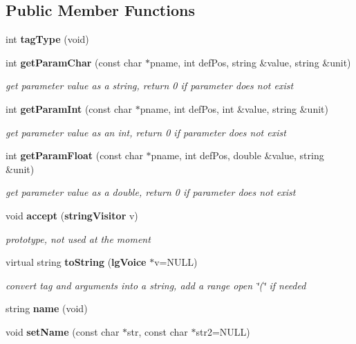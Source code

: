 \subsection*{Public Member Functions}
\begin{CompactItemize}
\item 
int {\bf tag\-Type} (void)
\item 
int {\bf get\-Param\-Char} (const char $\ast$pname, int def\-Pos, string \&value, string \&unit)
\begin{CompactList}\small\item\em get parameter value as a string, return 0 if parameter does not exist \item\end{CompactList}\item 
int {\bf get\-Param\-Int} (const char $\ast$pname, int def\-Pos, int \&value, string \&unit)
\begin{CompactList}\small\item\em get parameter value as an int, return 0 if parameter does not exist \item\end{CompactList}\item 
int {\bf get\-Param\-Float} (const char $\ast$pname, int def\-Pos, double \&value, string \&unit)
\begin{CompactList}\small\item\em get parameter value as a double, return 0 if parameter does not exist \item\end{CompactList}\item 
void {\bf accept} ({\bf string\-Visitor} v)
\begin{CompactList}\small\item\em prototype, not used at the moment \item\end{CompactList}\item 
virtual string {\bf to\-String} ({\bf lg\-Voice} $\ast$v=NULL)
\begin{CompactList}\small\item\em convert tag and arguments into a string, add a range open \char`\"{}(\char`\"{} if needed \item\end{CompactList}\item 
string {\bf name} (void)
\item 
void {\bf set\-Name} (const char $\ast$str, const char $\ast$str2=NULL)
\item 

\end{CompactItemize}
